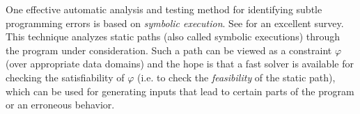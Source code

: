 One effective
automatic analysis and testing method for identifying subtle programming errors is based on \emph{symbolic execution}.
See \cite{symbex-survey} for an excellent survey. 
This technique analyzes static paths
(also called symbolic executions) through the program under consideration. %
Such a path can be viewed as a constraint $\varphi$ (over
appropriate data domains) and the hope is that a fast
solver is available for checking the satisfiability of $\varphi$ (i.e. to check
the \emph{feasibility} of the static path), which can be used for generating
inputs that lead to certain parts of the program or an erroneous behavior.







